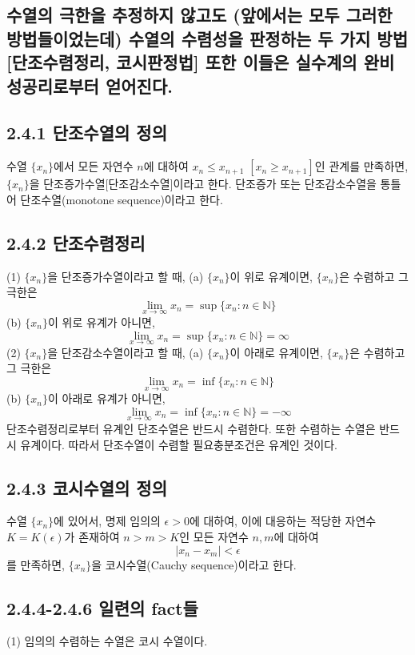 \documentclass{article}
\begin{document}
\subsection{\fontsize{11.5}{13}\selectfont 수열의 극한을 추정하지 않고도 (앞에서는 모두 그러한 방법들이었는데) 수열의 수렴성을 판정하는 두 가지 방법 [단조수렴정리, 코시판정법] 또한 이들은 실수계의 완비성공리로부터 얻어진다.}

\subsection*{\textmd{2.4.1 단조수열의 정의}}
수열 \( \{ x_n \} \)에서 모든 자연수 \( n \)에 대하여 \( x_n \leq x_{n+1} \) \([x_n \geq x_{n+1}]\)인 관계를 만족하면, \( \{ x_n \} \)을 단조증가수열[단조감소수열]이라고 한다. 단조증가 또는 단조감소수열을 통틀어 단조수열(monotone sequence)이라고 한다.

\subsection*{\textmd{2.4.2 단조수렴정리}}
(1) \( \{ x_n \} \)을 단조증가수열이라고 할 때,  
(a) \( \{ x_n \} \)이 위로 유계이면, \( \{ x_n \} \)은 수렴하고 그 극한은  
\[
\lim_{x \to \infty} x_n = \sup \{ x_n : n \in \mathbb{N} \}
\]
(b) \( \{ x_n \} \)이 위로 유계가 아니면,  
\[
\lim_{x \to \infty} x_n = \sup \{ x_n : n \in \mathbb{N} \} = \infty
\]
(2) \( \{ x_n \} \)을 단조감소수열이라고 할 때,  
(a) \( \{ x_n \} \)이 아래로 유계이면, \( \{ x_n \} \)은 수렴하고 그 극한은  
\[
\lim_{x \to \infty} x_n = \inf \{ x_n : n \in \mathbb{N} \}
\]
(b) \( \{ x_n \} \)이 아래로 유계가 아니면,  
\[
\lim_{x \to \infty} x_n = \inf \{ x_n : n \in \mathbb{N} \} = -\infty
\]
단조수렴정리로부터 유계인 단조수열은 반드시 수렴한다. 또한 수렴하는 수열은 반드시 유계이다. 따라서 단조수열이 수렴할 필요충분조건은 유계인 것이다.

\subsection*{\textmd{2.4.3 코시수열의 정의}}
수열 \( \{ x_n \} \)에 있어서, 명제  
임의의 \( \epsilon > 0 \)에 대하여, 이에 대응하는 적당한 자연수 \( K = K(\epsilon) \)가 존재하여  
\( n > m > K \)인 모든 자연수 \( n, m \)에 대하여  
\[
|x_n - x_m| < \epsilon
\]
를 만족하면, \( \{ x_n \} \)을 코시수열(Cauchy sequence)이라고 한다.

\subsection*{\textmd{2.4.4-2.4.6 일련의 fact들}}
(1) 임의의 수렴하는 수열은 코시 수열이다.  
\end{document}
